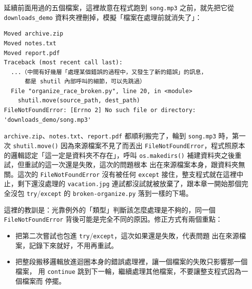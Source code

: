 延續前面用過的五個檔案，這裡故意在程式跑到 \texttt{song.mp3} 之前，就先把它從
\texttt{downloads\_demo} 資料夾裡刪掉，模擬「檔案在處理前就消失了」：

\begin{verbatim}
Moved archive.zip
Moved notes.txt
Moved report.pdf
Traceback (most recent call last):
  ...（中間有好幾層「處理某個錯誤的過程中，又發生了新的錯誤」的訊息，
      都是 shutil 內部呼叫的細節，可以先跳過）
  File "organize_race_broken.py", line 20, in <module>
    shutil.move(source_path, dest_path)
FileNotFoundError: [Errno 2] No such file or directory: 'downloads_demo/song.mp3'
\end{verbatim}

\texttt{archive.zip}、\texttt{notes.txt}、\texttt{report.pdf} 都順利搬完了，輪到
\texttt{song.mp3} 時，第一次 \texttt{shutil.move()} 因為來源檔案不見了而丟出
\texttt{FileNotFoundError}，程式照原本的邏輯認定「這一定是資料夾不存在」，呼叫
\texttt{os.makedirs()} 補建資料夾之後重試，但重試的這一次還是失敗，這次的問題根本
出在來源檔案本身，跟資料夾無關。這次的 \texttt{FileNotFoundError} 沒有被任何
\texttt{except} 接住，整支程式就在這裡中止，剩下還沒處理的 \texttt{vacation.jpg}
連試都沒試就被放棄了，跟本章一開始那個完全沒包 \texttt{try}/\texttt{except} 的
\texttt{broken-organize.py} 落到一樣的下場。

這裡的教訓是：光靠例外的「類型」判斷該怎麼處理是不夠的，同一個
\texttt{FileNotFoundError} 背後可能是完全不同的原因。修正方式有兩個重點：

\begin{itemize}
\item 把第二次嘗試也包進 \texttt{try}/\texttt{except}，這次如果還是失敗，代表問題
出在來源檔案，記錄下來就好，不用再重試。
\item 把整段搬移邏輯放進迴圈本身的錯誤處理裡，讓一個檔案的失敗只影響那一個檔案，
用 \texttt{continue} 跳到下一輪，繼續處理其他檔案，不要讓整支程式因為一個檔案而
停擺。
\end{itemize}

